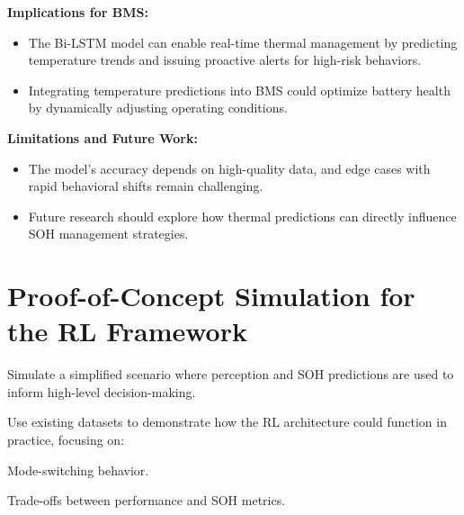 \textbf{Implications for \gls{BMS}:}
\begin{itemize}
    \item The Bi-LSTM model can enable real-time thermal management by predicting temperature trends and issuing proactive alerts for high-risk behaviors.
    \item Integrating temperature predictions into \gls{BMS} could optimize battery health by dynamically adjusting operating conditions.
\end{itemize}

\textbf{Limitations and Future Work:}
\begin{itemize}
    \item The model's accuracy depends on high-quality data, and edge cases with rapid behavioral shifts remain challenging.
    \item Future research should explore how thermal predictions can directly influence \gls{SOH} management strategies.
\end{itemize}


\section{Proof-of-Concept Simulation for the \gls{RL} Framework}

Simulate a simplified scenario where perception and SOH predictions are used to inform high-level decision-making.

Use existing datasets to demonstrate how the \gls{RL} architecture could function in practice, focusing on:

Mode-switching behavior.

Trade-offs between performance and \gls{SOH} metrics.

\endinput